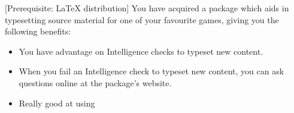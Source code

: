 \label{f:TypesettingSavant}

\DndFeatHeader{\TypesettingSavant}[Prerequisite: \LaTeX{} distribution]
You have acquired a package which aids in typesetting source material for one of your favourite games, giving you the following benefits:

\begin{itemize}
  \item You have advantage on Intelligence checks to typeset new content.
  \item When you fail an Intelligence check to typeset new content, you can ask questions online at the package's website.
  \item Really good at using \FoosQuill
\end{itemize}
